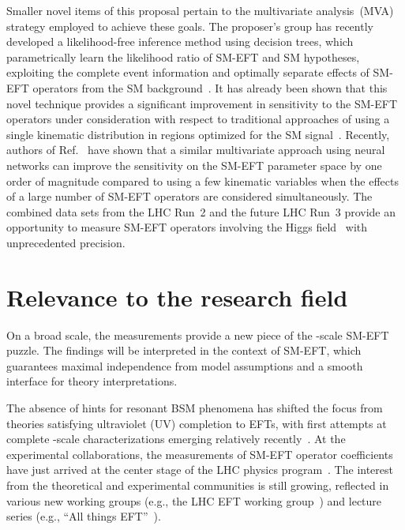 \documentclass[a4paper,11pt]{article}
\begin{document}
Smaller novel items of this proposal pertain to the multivariate analysis~(MVA) strategy employed to achieve these goals. 
The proposer's group has recently developed a likelihood-free inference method using decision trees, which parametrically learn the likelihood ratio of SM-EFT and SM hypotheses, exploiting the complete event information and optimally separate effects of SM-EFT operators from the SM background~\cite{Chatterjee:2021nms,Chatterjee:2022oco}. It has already been shown that this novel technique provides a significant improvement in sensitivity to the SM-EFT operators under consideration with respect to traditional approaches of using a single kinematic distribution in regions optimized for the SM signal~\cite{Chatterjee:2022oco}.
Recently, authors of Ref.~\cite{GomezAmbrosio:2022mpm} have shown that a similar multivariate approach using neural networks can improve the sensitivity on the SM-EFT parameter space by one order of magnitude compared to using a few kinematic variables when the effects of a large number of SM-EFT operators are considered simultaneously.
The combined data sets from the LHC Run~2 and the future LHC Run~3 provide an opportunity to measure SM-EFT operators involving the Higgs field~\cite{Elias-Miro:2013mua,Gupta:2014rxa} with unprecedented precision.

\section{Relevance to the research field}
\label{sec:relevance}

On a broad scale, the measurements provide a new piece of the {\TeV}-scale SM-EFT puzzle. 
The findings will be interpreted in the context of SM-EFT, which guarantees maximal independence from model assumptions and a smooth interface for theory interpretations.  

The absence of hints for resonant BSM phenomena has shifted the focus from theories satisfying ultraviolet (UV) completion to EFTs, with first attempts at complete {\TeV}-scale characterizations emerging relatively recently~\cite{Ellis:2018gqa,Ellis:2020unq,Ethier:2021bye}.
At the experimental collaborations, the measurements of SM-EFT operator coefficients have just arrived at the center stage of the LHC physics program~\cite{CMS:2021nnc,CMS:2021aly,CMS:2021gme}.
The interest from the theoretical and experimental communities is still growing, reflected in various new working groups (e.g., the  LHC EFT working group~\cite{LHC_EFT_WG}) and lecture series (e.g., ``All things EFT''~\cite{All_EFT}).
\end{document}
